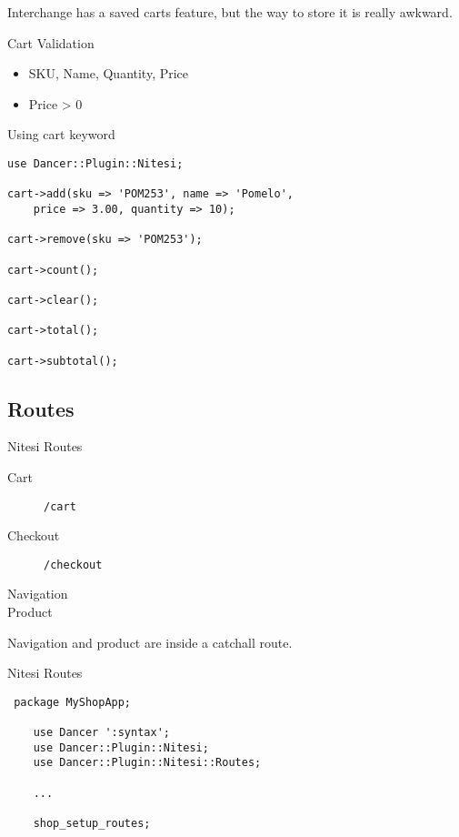 Interchange has a saved carts feature, but the way to store it is
really awkward.

\begin{frame}{Cart Validation}
\begin{itemize}
\item SKU, Name, Quantity, Price
\item Price > 0
\end{itemize}
\end{frame}

\begin{frame}[fragile]{Using cart keyword}
\begin{lstlisting}
use Dancer::Plugin::Nitesi;

cart->add(sku => 'POM253', name => 'Pomelo',
    price => 3.00, quantity => 10);

cart->remove(sku => 'POM253');

cart->count();

cart->clear();

cart->total();

cart->subtotal();
\end{lstlisting}
\end{frame}

\subsection{Routes}

\begin{frame}[fragile]{Nitesi Routes}
\begin{description}
\item[Cart] \verb|/cart| 
\item[Checkout] \verb|/checkout|
\item[Navigation]
\item[Product] 
\end{description}
\end{frame}

Navigation and product are inside a catchall route.

\begin{frame}[fragile]{Nitesi Routes}
\begin{lstlisting}
 package MyShopApp;

    use Dancer ':syntax';
    use Dancer::Plugin::Nitesi;
    use Dancer::Plugin::Nitesi::Routes;

    ...

    shop_setup_routes;
\end{lstlisting}
\end{frame}

